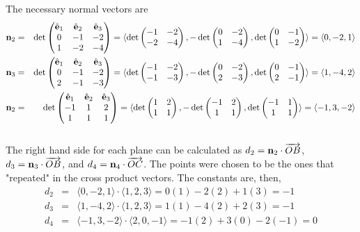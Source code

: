 \documentclass[12pt]{amsbook}
\newcommand{\la}{\langle}
\newcommand{\ra}{\rangle}
\begin{document}
The necessary normal vectors are
\begin{eqnarray*}
{\bf n}_2&=&\det
\begin{pmatrix}
\hat{\bf e}_1 & \hat{\bf e}_2 & \hat{\bf e}_3\cr 0&-1&-2\cr 1&-2&-4 \end{pmatrix}=\la \det\begin{pmatrix}-1&-2\cr -2&-4  \end{pmatrix}, -\det\begin{pmatrix}0&-2\cr 1&-4  \end{pmatrix}, \det\begin{pmatrix}0&-1\cr 1&-2 \end{pmatrix} \ra = \la 0,-2,1 \ra \\
{\bf n}_3&=&\det
\begin{pmatrix}
\hat{\bf e}_1 & \hat{\bf e}_2 & \hat{\bf e}_3\cr 0&-1&-2\cr 2&-1&-3 \end{pmatrix}=\la \det\begin{pmatrix}-1&-2\cr -1&-3  \end{pmatrix}, -\det\begin{pmatrix}0&-2\cr 2&-3  \end{pmatrix}, \det\begin{pmatrix}0&-1\cr 2&-1 \end{pmatrix} \ra = \la 1,-4,2 \ra \\
{\bf n}_2&=&\det
\begin{pmatrix}
\hat{\bf e}_1 & \hat{\bf e}_2 & \hat{\bf e}_3\cr -1&1&2\cr 1&1&1 \end{pmatrix}=\la \det\begin{pmatrix}1&2\cr 1&1  \end{pmatrix}, -\det\begin{pmatrix}-1&2\cr 1&1  \end{pmatrix}, \det\begin{pmatrix}-1&1\cr 1&1 \end{pmatrix} \ra = \la -1,3,-2 \ra 
\end{eqnarray*}
\\
The right hand side for each plane can be calculated as $d_2={\bf n}_2\cdot\overrightarrow{OB}$, $d_3={\bf n}_3\cdot\overrightarrow{OB}$, and $d_4={\bf n}_4\cdot\overrightarrow{OC}$. The points were chosen to be the ones that "repeated" in the cross product vectors. The constants are, then,
\begin{eqnarray*}
d_2&=&\la 0,-2,1\ra \cdot \la 1,2,3 \ra = 0(1)-2(2)+1(3)=-1 \\
d_3&=&\la 1,-4,2\ra \cdot \la 1,2,3 \ra = 1(1)-4(2)+2(3)=-1 \\
d_4&=&\la -1,3,-2\ra \cdot \la 2,0,-1 \ra = -1(2)+3(0)-2(-1)=0
\end{eqnarray*}
\end{document}
